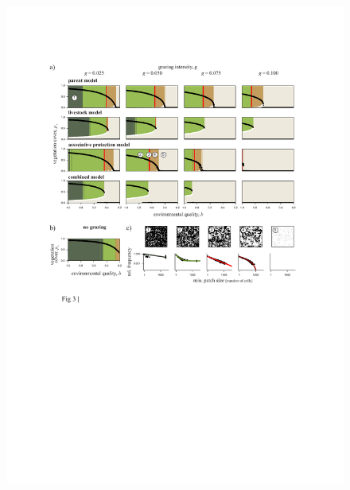\newpage

\begin{figure}[h]%
\includegraphics[width=\columnwidth]{figures/fig3.pdf}%
\caption{}%
\label{}%
\end{figure}


